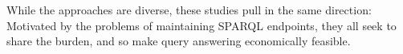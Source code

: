 

While the approaches are diverse, these studies pull in the same
direction: Motivated by the problems of maintaining SPARQL endpoints,
they all seek to share the burden, and so make query answering
economically feasible.




